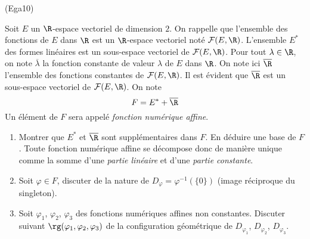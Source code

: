 \begin{tiny}(Ega10)\end{tiny} Soit $E$ un $\R$-espace vectoriel de dimension $2$. On rappelle que l'ensemble des fonctions de $E$ dans $\R$ est un $\R$-espace vectoriel noté $\mathcal{F}(E,\R)$. L'ensemble $E^*$ des formes linéaires est un sous-espace vectoriel de $\mathcal{F}(E,\R)$. Pour tout $\lambda\in \R$, on note $\overline{\lambda}$ la fonction constante de valeur $\lambda$ de $E$ dans $\R$. On note ici $\overline{\R}$ l'ensemble des fonctions constantes de $\mathcal{F}(E,\R)$. Il est évident que $\overline{\R}$ est un sous-espace vectoriel de $\mathcal{F}(E,\R)$. On note
\begin{displaymath}
  F = E^* + \overline{\R}
\end{displaymath}
Un élément de $F$ sera appelé \emph{fonction numérique affine}.
\begin{enumerate}
  \item Montrer que $E^*$ et $\overline{\R}$ sont supplémentaires dans $F$. En déduire une base de $F$. Toute fonction numérique affine se décompose donc de manière unique comme la somme d'une \emph{partie linéaire} et d'une \emph{partie constante}.
  \item Soit $\varphi \in F$, discuter de la nature de $D_\varphi = \varphi^{-1}(\{0\})$ (image réciproque du singleton).
  \item Soit $\varphi_1$, $\varphi_2$, $\varphi_3$ des fonctions numériques affines non constantes. Discuter suivant $\rg(\varphi_1,\varphi_2,\varphi_3)$ de la configuration géométrique de $D_{\varphi_1}$, $D_{\varphi_2}$, $D_{\varphi_3}$.
\end{enumerate}
